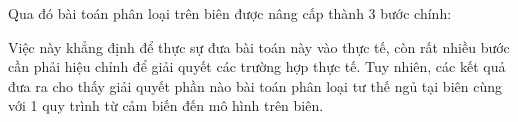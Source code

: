 Qua đó bài toán phân loại trên biên được nâng cấp thành 3 bước chính:

\usetikzlibrary{shapes.geometric, positioning}


Việc này khẳng định để thực sự đưa bài toán này vào thực tế, còn rất nhiều bước
cần phải hiệu chỉnh để giải quyết các trường hợp thực tế. Tuy nhiên, các kết
quả đưa ra cho thấy giải quyết phần nào bài toán phân loại tư thế ngủ tại biên
cùng với 1 quy trình từ cảm biến đến mô hình trên biên.